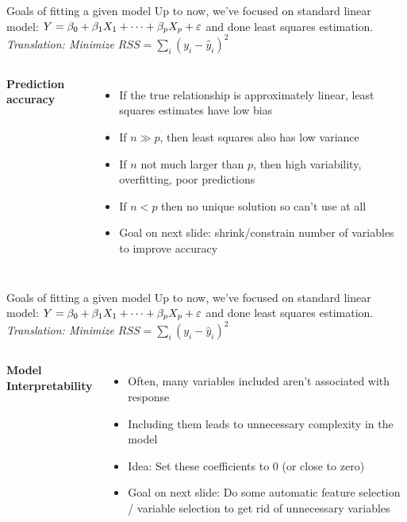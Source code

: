 \documentclass[aspectratio=169,usenames,dvipsnames]{beamer}
\newcommand{\InstructorNotes}[1]{\textit{\color{orange}#1}}
\newcommand{\InstructorList}[1]{
\begin{itemize}
	\color{orange}
	#1
\end{itemize}
}
\begin{document}
\begin{frame}[t]{Goals of fitting a given model}
	Up to now, we've focused on standard linear model:
		$Y = \beta_0 + \beta_1 X_1 + \cdots + \beta_p X_p + \varepsilon$
	and done least squares estimation.
	\InstructorNotes{Translation: Minimize $RSS = \sum_{i}(y_i-\hat y_i)^2$}
\begin{columns}
\centering
\textbf{Prediction accuracy}
\footnotesize
\InstructorList{
\item If the true relationship is approximately linear, least squares estimates have low bias
\item If $n \gg p$, then least squares also has low variance
\item If $n$ not much larger than $p$, then high variability, overfitting, poor predictions
\item If $n<p$ then no unique solution so can't use at all
\item Goal on next slide: shrink/constrain number of variables to improve accuracy
}
\centering
\end{columns}

\end{frame}
\begin{frame}[t]{Goals of fitting a given model}
	Up to now, we've focused on standard linear model:
		$Y = \beta_0 + \beta_1 X_1 + \cdots + \beta_p X_p + \varepsilon$
	and done least squares estimation.
	\InstructorNotes{Translation: Minimize $RSS = \sum_{i}(y_i-\hat y_i)^2$}
\begin{columns}
	\centering


\textbf{Model Interpretability}
\footnotesize
\InstructorList{
\item Often, many variables included aren't associated with response
\item Including them leads to unnecessary complexity in the model
\item Idea: Set these coefficients to 0 (or close to zero)
\item Goal on next slide: Do some automatic feature selection / variable selection to get rid of unnecessary variables
}
\centering
\end{columns}

\end{frame}
\end{document}
